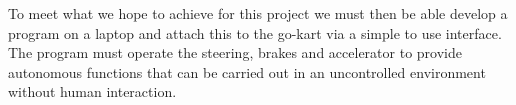 To meet what we hope to achieve for this project we must then be able develop a program on a laptop and attach this to the go-kart via a simple to use interface. The program must operate the steering, brakes and accelerator to provide autonomous functions that can be carried out in an uncontrolled environment without human interaction. 

